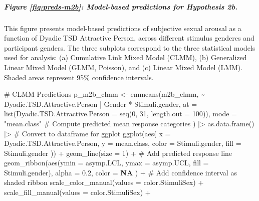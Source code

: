 \documentclass[
  bookmarksnumbered]{article}
\newenvironment{Shaded}{\begin{snugshade}}{\end{snugshade}}
\newcommand{\AttributeTok}[1]{\textcolor[rgb]{0.80,0.80,0.80}{#1}}
\newcommand{\CommentTok}[1]{\textcolor[rgb]{0.50,0.62,0.50}{#1}}
\newcommand{\ConstantTok}[1]{\textcolor[rgb]{0.86,0.64,0.64}{\textbf{#1}}}
\newcommand{\DecValTok}[1]{\textcolor[rgb]{0.86,0.86,0.80}{#1}}
\newcommand{\FloatTok}[1]{\textcolor[rgb]{0.75,0.75,0.82}{#1}}
\newcommand{\FunctionTok}[1]{\textcolor[rgb]{0.94,0.94,0.56}{#1}}
\newcommand{\NormalTok}[1]{\textcolor[rgb]{0.80,0.80,0.80}{#1}}
\newcommand{\OtherTok}[1]{\textcolor[rgb]{0.94,0.94,0.56}{#1}}
\newcommand{\SpecialCharTok}[1]{\textcolor[rgb]{0.86,0.64,0.64}{#1}}
\newcommand{\StringTok}[1]{\textcolor[rgb]{0.80,0.58,0.58}{#1}}
\begin{document}
\subparagraph{Figure \ref{fig:preds-m2b}: Model-based predictions for Hypothesis 2b.}\label{figure-reffigpreds-m2b-model-based-predictions-for-hypothesis-2b.}

This figure presents model-based predictions of subjective sexual arousal as a function of Dyadic TSD Attractive Person, across different stimulus genderes and participant genders. The three subplots correspond to the three statistical models used for analysis: (a) Cumulative Link Mixed Model (CLMM), (b) Generalized Linear Mixed Model (GLMM, Poisson), and (c) Linear Mixed Model (LMM). Shaded areas represent 95\% confidence intervals.

\begin{Shaded}
\begin{Highlighting}[]
\CommentTok{\# CLMM Predictions}
\NormalTok{p\_m2b\_clmm }\OtherTok{\textless{}{-}} \FunctionTok{emmeans}\NormalTok{(m2b\_clmm, }\SpecialCharTok{\textasciitilde{}}\NormalTok{ Dyadic.TSD.Attractive.Person }\SpecialCharTok{|}\NormalTok{ Gender }\SpecialCharTok{*}\NormalTok{ Stimuli.gender,}
  \AttributeTok{at =} \FunctionTok{list}\NormalTok{(}\AttributeTok{Dyadic.TSD.Attractive.Person =} \FunctionTok{seq}\NormalTok{(}\DecValTok{0}\NormalTok{, }\DecValTok{31}\NormalTok{, }\AttributeTok{length.out =} \DecValTok{100}\NormalTok{)),}
  \AttributeTok{mode =} \StringTok{"mean.class"} \CommentTok{\# Compute predicted mean response categories}
\NormalTok{) }\SpecialCharTok{|\textgreater{}}
  \FunctionTok{as.data.frame}\NormalTok{() }\SpecialCharTok{|\textgreater{}} \CommentTok{\# Convert to dataframe for ggplot}
  \FunctionTok{ggplot}\NormalTok{(}\FunctionTok{aes}\NormalTok{(}
    \AttributeTok{x =}\NormalTok{ Dyadic.TSD.Attractive.Person, }\AttributeTok{y =}\NormalTok{ mean.class,}
    \AttributeTok{color =}\NormalTok{ Stimuli.gender, }\AttributeTok{fill =}\NormalTok{ Stimuli.gender}
\NormalTok{  )) }\SpecialCharTok{+}
  \FunctionTok{geom\_line}\NormalTok{(}\AttributeTok{size =} \DecValTok{1}\NormalTok{) }\SpecialCharTok{+} \CommentTok{\# Add predicted response line}
  \FunctionTok{geom\_ribbon}\NormalTok{(}\FunctionTok{aes}\NormalTok{(}\AttributeTok{ymin =}\NormalTok{ asymp.LCL, }\AttributeTok{ymax =}\NormalTok{ asymp.UCL, }\AttributeTok{fill =}\NormalTok{ Stimuli.gender),}
    \AttributeTok{alpha =} \FloatTok{0.2}\NormalTok{, }\AttributeTok{color =} \ConstantTok{NA}
\NormalTok{  ) }\SpecialCharTok{+} \CommentTok{\# Add confidence interval as shaded ribbon}
  \FunctionTok{scale\_color\_manual}\NormalTok{(}\AttributeTok{values =}\NormalTok{ color.StimuliSex) }\SpecialCharTok{+}
  \FunctionTok{scale\_fill\_manual}\NormalTok{(}\AttributeTok{values =}\NormalTok{ color.StimuliSex) }\SpecialCharTok{+}

\end{Highlighting}
\end{Shaded}
\end{document}
